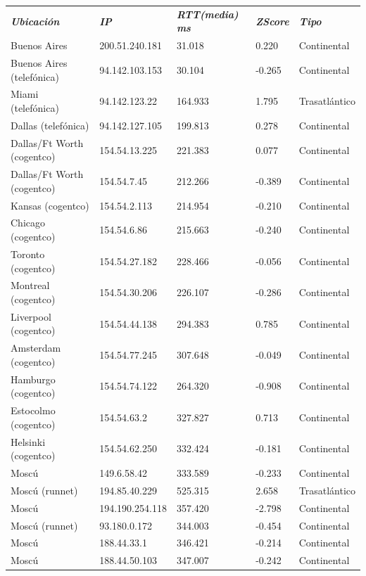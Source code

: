 \begin{tabular}{lllll}

	\textit{\textbf{Ubicaci\'on}}	&	\textit{\textbf{IP}}	&	\textit{\textbf{RTT(media) ms}}	&	\textit{\textbf{ZScore}}	&	\textit{\textbf{Tipo}}	\\
	Buenos Aires			&	200.51.240.181	&	31.018	&	0.220	&	Continental	\\
	Buenos Aires (telef\'onica)	&	94.142.103.153	&	30.104	&	-0.265	&	Continental	\\
	Miami (telef\'onica)		&	94.142.123.22	&	164.933	&	1.795	&	Trasatl\'antico	\\
	Dallas (telef\'onica)		&	94.142.127.105	&	199.813	&	0.278	&	Continental	\\
	Dallas/Ft Worth (cogentco)	&	154.54.13.225	&	221.383	&	0.077	&	Continental	\\
	Dallas/Ft Worth (cogentco)	&	154.54.7.45	&	212.266	&	-0.389	&	Continental	\\
	Kansas (cogentco)		&	154.54.2.113	&	214.954	&	-0.210	&	Continental	\\
	Chicago (cogentco)		&	154.54.6.86	&	215.663	&	-0.240	&	Continental	\\
	Toronto (cogentco)		&	154.54.27.182	&	228.466	&	-0.056	&	Continental	\\
	Montreal (cogentco)		&	154.54.30.206	&	226.107	&	-0.286	&	Continental	\\
	Liverpool (cogentco)		&	154.54.44.138	&	294.383	&	0.785	&	Continental	\\
	Amsterdam (cogentco)		&	154.54.77.245	&	307.648	&	-0.049	&	Continental	\\
	Hamburgo (cogentco)		&	154.54.74.122	&	264.320	&	-0.908	&	Continental	\\
	Estocolmo (cogentco)		&	154.54.63.2	&	327.827	&	0.713	&	Continental	\\
	Helsinki (cogentco)		&	154.54.62.250	&	332.424	&	-0.181	&	Continental	\\
	Mosc\'u				&	149.6.58.42	&	333.589	&	-0.233	&	Continental	\\
	Mosc\'u (runnet)		&	194.85.40.229	&	525.315	&	2.658	&	Trasatl\'antico	\\
	Mosc\'u 			&	194.190.254.118	&	357.420	&	-2.798	&	Continental	\\
	Mosc\'u (runnet)		&	93.180.0.172	&	344.003	&	-0.454	&	Continental	\\
	Mosc\'u				&	188.44.33.1	&	346.421	&	-0.214	&	Continental	\\ 	
	Mosc\'u				&	188.44.50.103	&	347.007	&	-0.242	&	Continental	\\	

\end{tabular}

